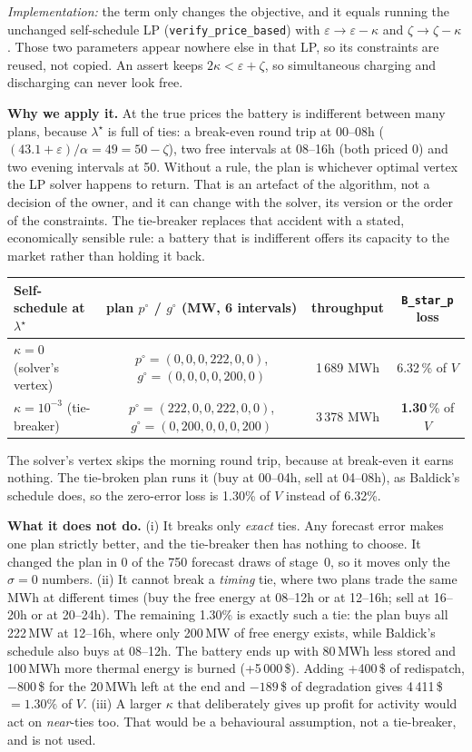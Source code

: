 \documentclass[10pt,a4paper]{article}
\newcommand{\code}[1]{\texttt{#1}}
\newcommand{\lamstar}{\lambda^{\star}}
\begin{document}
\emph{Implementation:} the term only changes the objective, and it equals running the unchanged
self-schedule LP (\code{verify\_price\_based}) with $\varepsilon\to\varepsilon-\kappa$ and $\zeta\to\zeta-\kappa$.
Those two parameters appear nowhere else in that LP, so its constraints are reused, not copied. An assert keeps
$2\kappa<\varepsilon+\zeta$, so simultaneous charging and discharging can never look free.

\textbf{Why we apply it.} At the true prices the battery is indifferent between many plans, because
$\lamstar$ is full of ties: a break-even round trip at 00--08h ($(43.1+\varepsilon)/\alpha=49=50-\zeta$), two
free intervals at 08--16h (both priced 0) and two evening intervals at 50. Without a rule, the plan is
whichever optimal vertex the LP solver happens to return. That is an artefact of the algorithm, not a
decision of the owner, and it can change with the solver, its version or the order of the constraints. The
tie-breaker replaces that accident with a stated, economically sensible rule: a battery that is indifferent
offers its capacity to the market rather than holding it back.
\begin{center}\small
\begin{tabular}{@{}lccc@{}}
\toprule
Self-schedule at $\lamstar$ & plan $p^\circ$ / $g^\circ$ (MW, 6 intervals) & throughput & \code{B\_star\_p} loss \\
\midrule
$\kappa=0$ (solver's vertex) & $p^\circ=(0,0,0,222,0,0)$, $g^\circ=(0,0,0,0,200,0)$ & 1\,689 MWh & 6.32\,\% of $V$\\
$\kappa=10^{-3}$ (tie-breaker) & $p^\circ=(222,0,0,222,0,0)$, $g^\circ=(0,200,0,0,0,200)$ & 3\,378 MWh & \textbf{1.30}\,\% of $V$\\
\bottomrule
\end{tabular}
\end{center}
The solver's vertex skips the morning round trip, because at break-even it earns nothing. The tie-broken plan
runs it (buy at 00--04h, sell at 04--08h), as Baldick's schedule does, so the zero-error loss is 1.30\% of
$V$ instead of 6.32\%.

\textbf{What it does not do.} (i) It breaks only \emph{exact} ties. Any forecast error makes one plan strictly
better, and the tie-breaker then has nothing to choose. It changed the plan in 0 of the 750 forecast draws of
stage~0, so it moves only the $\sigma=0$ numbers. (ii) It cannot break a \emph{timing} tie, where two plans
trade the same MWh at different times (buy the free energy at 08--12h or at 12--16h; sell at 16--20h or at
20--24h). The remaining 1.30\% is exactly such a tie: the plan buys all 222\,MW at 12--16h, where only
200\,MW of free energy exists, while Baldick's schedule also buys at 08--12h. The battery ends up with 80\,MWh
less stored and 100\,MWh more thermal energy is burned (+5\,000\,\$). Adding +400\,\$ of redispatch,
$-800$\,\$ for the 20\,MWh left at the end and $-189$\,\$ of degradation gives 4\,411\,\$ $=1.30\%$ of $V$.
(iii) A larger $\kappa$ that deliberately gives up profit for activity would act on \emph{near}-ties too.
That would be a behavioural assumption, not a tie-breaker, and is not used.
\end{document}
